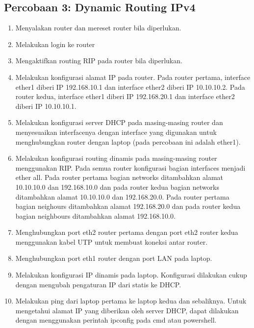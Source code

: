 \subsection{Percobaan 3: Dynamic Routing IPv4}
\begin{enumerate}
	\item Menyalakan router dan mereset router bila diperlukan.
	\item Melakukan login ke router
	\item Mengaktifkan routing RIP pada router bila diperlukan.
	\item Melakukan konfigurasi alamat IP pada router. Pada router pertama, interface ether1 diberi IP 192.168.10.1 dan interface ether2 diberi IP 10.10.10.2. Pada router kedua, interface ether1 diberi IP 192.168.20.1 dan interface ether2 diberi IP 10.10.10.1.
	\item Melakukan konfigurasi server DHCP pada masing-masing router dan menyesuaikan interfacenya dengan interface yang digunakan untuk menghubungkan router dengan laptop (pada percobaan ini adalah ether1).
	\item Melakukan konfigurasi routing dinamis pada masing-masing router menggunakan RIP. Pada semua router konfigurasi bagian interfaces menjadi ether all. Pada router pertama bagian networks ditambahkan alamat 10.10.10.0 dan 192.168.10.0 dan pada router kedua bagian networks ditambahkan alamat 10.10.10.0 dan 192.168.20.0. Pada router pertama bagian neighours ditambahkan alamat 192.168.20.0 dan pada router kedua bagian neighbours ditambahkan alamat 192.168.10.0.
	\item Menghubungkan port eth2 router pertama dengan port eth2 router kedua menggunakan kabel UTP untuk membuat koneksi antar router.
	\item Menghubungkan port eth1 router dengan port LAN pada laptop.
	\item Melakukan konfigurasi IP dinamis pada laptop. Konfigurasi dilakukan cukup dengan mengubah pengaturan IP dari statis ke DHCP.
	\item Melakukan ping dari laptop pertama ke laptop kedua dan sebaliknya. Untuk mengetahui alamat IP yang diberikan oleh server DHCP, dapat dilakukan dengan menggunakan perintah ipconfig pada cmd atau powershell.
\end{enumerate}

